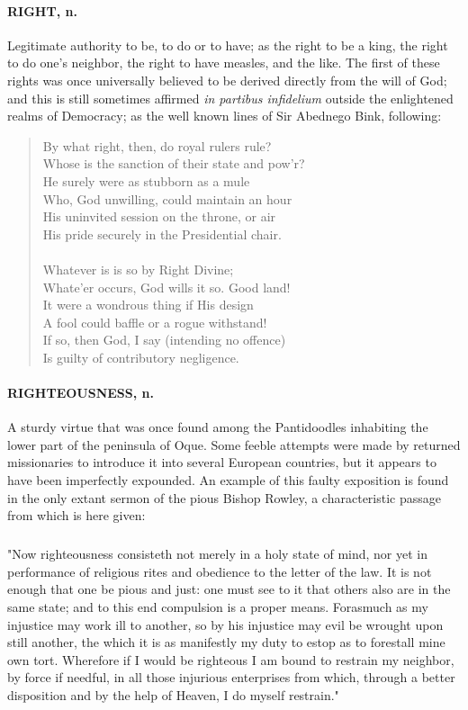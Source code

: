 \documentclass[11pt]{article}
\begin{document}
\paragraph{RIGHT, n.}  Legitimate authority to be, to do or to have; as the right
to be a king, the right to do one's neighbor, the right to have
measles, and the like.  The first of these rights was once universally
believed to be derived directly from the will of God; and this is
still sometimes affirmed {\em in partibus infidelium} outside the
enlightened realms of Democracy; as the well known lines of Sir
Abednego Bink, following:

\begin{quote}       By what right, then, do royal rulers rule? \\
          Whose is the sanction of their state and pow'r? \\
      He surely were as stubborn as a mule \\
          Who, God unwilling, could maintain an hour \\
  His uninvited session on the throne, or air \\
  His pride securely in the Presidential chair. \\
 \\
      Whatever is is so by Right Divine; \\
          Whate'er occurs, God wills it so.  Good land! \\
      It were a wondrous thing if His design \\
          A fool could baffle or a rogue withstand! \\
  If so, then God, I say (intending no offence) \\
  Is guilty of contributory negligence.  \end{quote}

\paragraph{RIGHTEOUSNESS, n.}  A sturdy virtue that was once found among the
Pantidoodles inhabiting the lower part of the peninsula of Oque.  Some
feeble attempts were made by returned missionaries to introduce it
into several European countries, but it appears to have been
imperfectly expounded.  An example of this faulty exposition is found
in the only extant sermon of the pious Bishop Rowley, a characteristic
passage from which is here given:

\subparagraph{}       "Now righteousness consisteth not merely in a holy state of
  mind, nor yet in performance of religious rites and obedience to
  the letter of the law.  It is not enough that one be pious and
  just:  one must see to it that others also are in the same state;
  and to this end compulsion is a proper means.  Forasmuch as my
  injustice may work ill to another, so by his injustice may evil be
  wrought upon still another, the which it is as manifestly my duty
  to estop as to forestall mine own tort.  Wherefore if I would be
  righteous I am bound to restrain my neighbor, by force if needful,
  in all those injurious enterprises from which, through a better
  disposition and by the help of Heaven, I do myself restrain."
\end{document}
